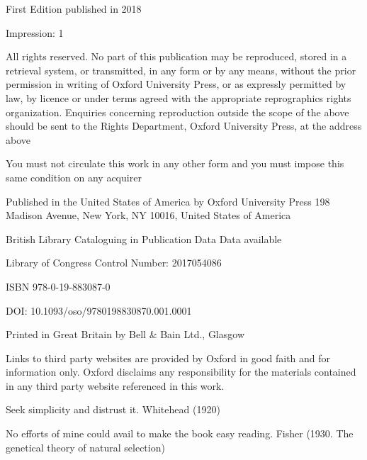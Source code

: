 \documentclass{article}
\begin{document}
First Edition published in 2018

Impression: 1

All rights reserved. No part of this publication may be reproduced, stored in a retrieval system, or transmitted, in any form or by any means, without the prior permission in writing of Oxford University Press, or as expressly permitted by law, by licence or under terms agreed with the appropriate reprographics rights organization. Enquiries concerning reproduction outside the scope of the above should be sent to the Rights Department, Oxford University Press, at the address above

You must not circulate this work in any other form and you must impose this same condition on any acquirer

Published in the United States of America by Oxford University Press 198 Madison Avenue, New York, NY 10016, United States of America

British Library Cataloguing in Publication Data
Data available

Library of Congress Control Number: 2017054086

ISBN 978-0-19-883087-0

DOI: 10.1093/oso/9780198830870.001.0001

Printed in Great Britain by Bell & Bain Ltd., Glasgow

Links to third party websites are provided by Oxford in good faith and for information only. Oxford disclaims any responsibility for the materials contained in any third party website referenced in this work.

Seek simplicity and distrust it. Whitehead (1920)

No efforts of mine could avail to make the book easy reading.
Fisher (1930. The genetical theory of natural selection)
\end{document}
